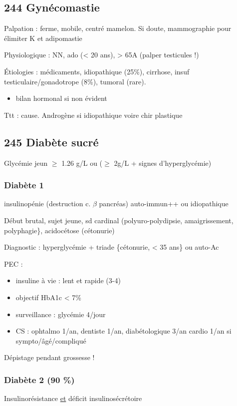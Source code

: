 \documentclass[11pt]{article}
\begin{document}
\subsection{244 Gynécomastie}
\label{sec:org507a917}
Palpation : ferme, mobile, centré mamelon. Si doute, mammographie pour élimiter
K et adipomastie

Physiologique : NN, ado (< 20 ans), > 65A (palper testicules !)

Étiologies : médicaments, idiopathique (25\%), cirrhose, insuf
testiculaire/gonadotrope (8\%), tumoral (rare).
\begin{itemize}
\item bilan hormonal si non évident
\end{itemize}

Ttt : cause. Androgène si idiopathique voire chir plastique
\subsection{245 Diabète sucré}
\label{sec:org7f87069}
Glycémie jeun \(\ge\) 1.26 g/L  ou (\(\ge\) 2g/L + signes d'hyperglycémie)
\subsubsection{Diabète 1}
\label{sec:org666b67d}
insulinopénie (destruction c. \(\beta\) pancréas) auto-immun++ ou idiopathique

Début brutal, sujet jeune, sd cardinal (polyuro-polydipsie, amaigrissement,
polyphagie\}, acidocétose (cétonurie)

Diagnostic : hyperglycémie + triade \{cétonurie, < 35 ans\} ou auto-Ac

PEC : 
\begin{itemize}
\item insuline à vie : lent et rapide (3-4)
\item objectif HbA1c < 7\%
\item surveillance : glycémie 4/jour
\item CS : ophtalmo 1/an, dentiste 1/an, diabétologique 3/an \textpm{} cardio 1/an
si sympto/âgé/compliqué
\end{itemize}

Dépistage pendant grossesse !

\subsubsection{Diabète 2 (90 \%)}
\label{sec:orga9ed0bf}
Insulinorésistance \uline{et} déficit insulinosécrétoire
\end{document}
